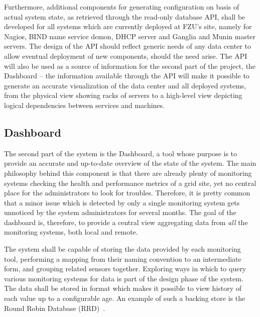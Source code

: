 \documentclass[12pt]{article}
\begin{document}
Furthermore, additional components for generating configuration on basis of actual system state, as retrieved through the
read-only database API, shall be developed for all systems which are currently deployed at FZU's site, namely for Nagios, BIND
name service demon, DHCP server and Ganglia and Munin master servers.  The design of the API should reflect generic needs of any
data center to allow eventual deployment of new components, should the need arise.  The API will also be used as a source of
information for the second part of the project, the Dashboard -- the information available through the API will make it possible
to generate an accurate visualization of the data center and all deployed systems, from the physical view showing racks of servers
to a high-level view depicting logical dependencies between services and machines.


\subsection{Dashboard}

The second part of the system is the Dashboard, a tool whose purpose is to provide an accurate and up-to-date overview of the
state of the system.  The main philosophy behind this component is that there are already plenty of monitoring systems checking
the health and performance metrics of a grid site, yet no central place for the administrators to look for troubles.  Therefore,
it is pretty common that a minor issue which is detected by only a single monitoring system gets unnoticed by the system
administrators for several months.  The goal of the dashboard is, therefore, to provide a central view aggregating data from {\em
all} the monitoring systems, both local and remote.

The system shall be capable of storing the data provided by each monitoring tool, performing a mapping from their naming
convention to an intermediate form, and grouping related sensors together.  Exploring ways in which to query various monitoring
systems for data is part of the design phase of the system.  The data shall be stored in format which makes it possible to view
history of each value up to a configurable age.  An example of such a backing store is the Round Robin Database (RRD)~\cite{rrd}.
\end{document}
